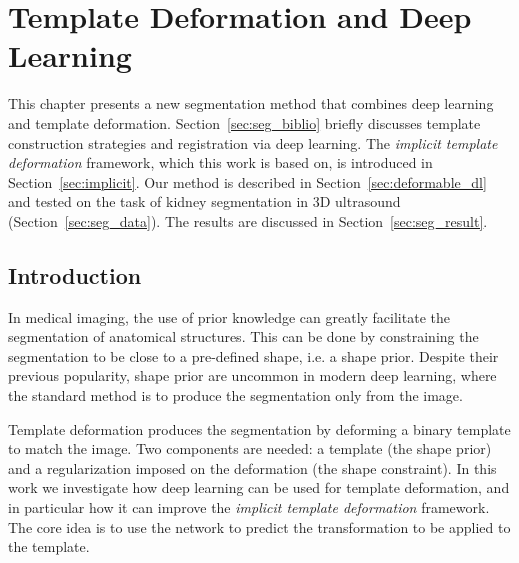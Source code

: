 \chapter{Template Deformation and Deep Learning}
\label{chap:seg}

\begin{chapabstract}
This chapter presents a new segmentation method that combines deep learning and template deformation.  Section~\ref{sec:seg_biblio} briefly discusses template construction strategies and registration via deep learning. The \textit{implicit template deformation} framework, which this work is based on, is introduced in Section~\ref{sec:implicit}. Our method is described in Section~\ref{sec:deformable_dl} and tested on the task of kidney segmentation in 3D ultrasound (Section~\ref{sec:seg_data}). The results are discussed in Section~\ref{sec:seg_result}.
\end{chapabstract}

\vspace{1cm}

{   
    \minitoc
}

\newpage

\section{Introduction}

In medical imaging, the use of prior knowledge can greatly facilitate the segmentation of anatomical structures. This can be done by constraining the segmentation to be close to a pre-defined shape, i.e. a shape prior. Despite their previous popularity, shape prior are uncommon in modern deep learning, where the standard method is to produce the segmentation only from the image. 

Template deformation produces the segmentation by deforming a binary template to match the image. Two components are needed: a template (the shape prior) and a regularization imposed on the deformation (the shape constraint). In this work we investigate how deep learning can be used for template deformation, and in particular how it can improve the \textit{implicit template deformation} framework. The core idea is to use the network to predict the transformation to be applied to the template.

